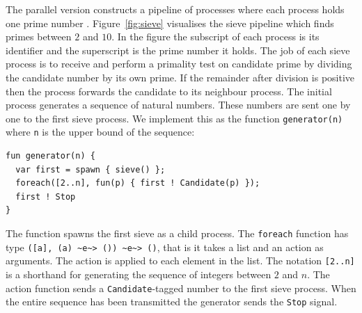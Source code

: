 \documentclass[12pt,mscres,cdtppar,twoside,openright,logo,rightchapter,normalheadings]{infthesis}
\theoremstyle{definition}
\begin{document}
The parallel version constructs a pipeline of processes where each
process holds one prime number
\citep{Andrews2000}. Figure~\ref{fig:sieve} visualises the sieve
pipeline which finds primes between $2$ and $10$. In the figure the
subscript of each process is its identifier and the superscript is the
prime number it holds. The job of each sieve process is to receive and
perform a primality test on candidate prime by dividing the candidate
number by its own prime. If the remainder after division is positive
then the process forwards the candidate to its neighbour process. The
initial process generates a sequence of natural numbers. These numbers
are sent one by one to the first sieve process. We implement this as
the function \lstinline$generator(n)$ where \lstinline$n$ is the upper
bound of the sequence:
%
\begin{lstlisting}
fun generator(n) {
  var first = spawn { sieve() };
  foreach([2..n], fun(p) { first ! Candidate(p) });
  first ! Stop
}
\end{lstlisting}
%
The function spawns the first sieve as a child process. The
\lstinline$foreach$ function has type
\lstinline$([a], (a) ~e~> ()) ~e~> ()$, that is it takes a list and an
action as arguments. The action is applied to each element in the
list. The notation \lstinline$[2..n]$ is a shorthand for generating
the sequence of integers between $2$ and $n$. The action function
sends a \lstinline$Candidate$-tagged number to the first sieve
process. When the entire sequence has been transmitted the generator
sends the \lstinline$Stop$ signal.
\end{document}
